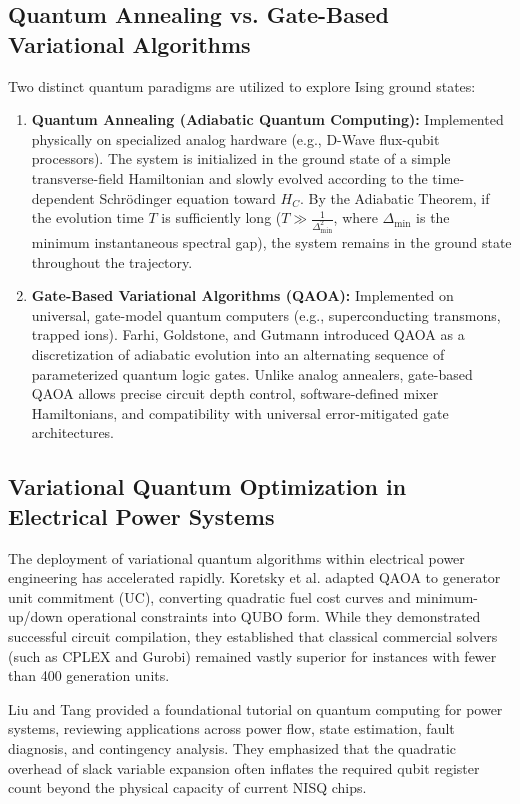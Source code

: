 \documentclass[11pt,a4paper]{article}
\theoremstyle{definition}
\theoremstyle{remark}
\begin{document}
\subsection{Quantum Annealing vs. Gate-Based Variational Algorithms}
Two distinct quantum paradigms are utilized to explore Ising ground states:
\begin{enumerate}
    \item \textbf{Quantum Annealing (Adiabatic Quantum Computing):} Implemented physically on specialized analog hardware (e.g., D-Wave flux-qubit processors). The system is initialized in the ground state of a simple transverse-field Hamiltonian and slowly evolved according to the time-dependent Schr{\"o}dinger equation toward $H_C$. By the Adiabatic Theorem, if the evolution time $T$ is sufficiently long ($T \gg \frac{1}{\Delta_{\min}^2}$, where $\Delta_{\min}$ is the minimum instantaneous spectral gap), the system remains in the ground state throughout the trajectory.
    \item \textbf{Gate-Based Variational Algorithms (QAOA):} Implemented on universal, gate-model quantum computers (e.g., superconducting transmons, trapped ions). Farhi, Goldstone, and Gutmann \cite{farhi2014} introduced QAOA as a discretization of adiabatic evolution into an alternating sequence of parameterized quantum logic gates. Unlike analog annealers, gate-based QAOA allows precise circuit depth control, software-defined mixer Hamiltonians, and compatibility with universal error-mitigated gate architectures.
\end{enumerate}

\subsection{Variational Quantum Optimization in Electrical Power Systems}
The deployment of variational quantum algorithms within electrical power engineering has accelerated rapidly. Koretsky et al. \cite{koretsky2021} adapted QAOA to generator unit commitment (UC), converting quadratic fuel cost curves and minimum-up/down operational constraints into QUBO form. While they demonstrated successful circuit compilation, they established that classical commercial solvers (such as CPLEX and Gurobi) remained vastly superior for instances with fewer than 400 generation units.

Liu and Tang \cite{liu2023} provided a foundational tutorial on quantum computing for power systems, reviewing applications across power flow, state estimation, fault diagnosis, and contingency analysis. They emphasized that the quadratic overhead of slack variable expansion often inflates the required qubit register count beyond the physical capacity of current NISQ chips.
\end{document}
